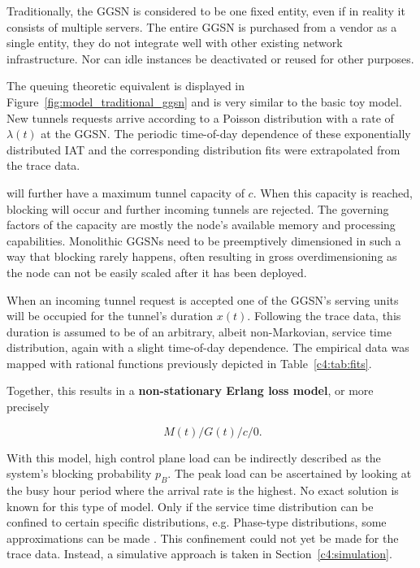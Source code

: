 Traditionally, the \gls{GGSN} is considered to be one fixed entity, even if in reality it consists of multiple servers. The entire \gls{GGSN} is purchased from a vendor as a single entity, they do not integrate well with other existing network infrastructure. Nor can idle instances be deactivated or reused for other purposes.

The queuing theoretic equivalent is displayed in Figure~\ref{fig:model_traditional_ggsn} and is very similar to the basic toy model.
New tunnels requests arrive according to a Poisson distribution with a rate of $\lambda(t)$ at the \gls{GGSN}. The periodic time-of-day dependence of these exponentially distributed \gls{IAT} and the corresponding distribution fits were extrapolated from the trace data.

 will further have a maximum tunnel capacity of $c$. When this capacity is reached, blocking will occur and further incoming tunnels are rejected. The governing factors of the capacity are mostly the node's available memory and processing capabilities. Monolithic \glspl{GGSN} need to be preemptively dimensioned in such a way that blocking rarely happens, often resulting in gross overdimensioning as the node can not be easily scaled after it has been deployed.

When an incoming tunnel request is accepted one of the \gls{GGSN}'s serving units will be occupied for the tunnel's duration $x(t)$. Following the trace data, this duration is assumed to be of an arbitrary, albeit non-Markovian, service time distribution, again with a slight time-of-day dependence.
The empirical data was mapped with rational functions previously depicted in Table~\ref{c4:tab:fits}.

Together, this results in a \textbf{non-stationary Erlang loss model}, or more precisely

\begin{equation}
\phantom{.}M(t)/G(t)/c/0\text{.}
\end{equation}

With this model, high control plane load can be indirectly described as the system's blocking probability $p_B$. The peak load can be ascertained by looking at the busy hour period where the arrival rate is the highest. No exact solution is known for this type of model. Only if the service time distribution can be confined to certain specific distributions, e.g. Phase-type distributions, some approximations can be made \cite{davis1995nonstationaryerlang}. This confinement could not yet be made for the trace data. Instead, a simulative approach is taken in Section~\ref{c4:simulation}.


